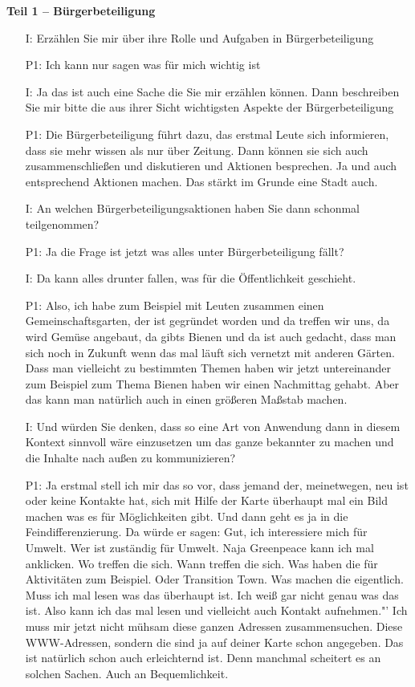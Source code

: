 \documentclass{sigchi}
\begin{document}
\textbf{Teil 1 -- B{\"u}rgerbeteiligung}
\begin{itemize}
    \item[I:] Erz{\"a}hlen Sie mir {\"u}ber ihre Rolle und Aufgaben in B{\"u}rgerbeteiligung
    \item[P1:] Ich kann nur sagen was f{\"u}r mich wichtig ist
    \item[I:] Ja das ist auch eine Sache die Sie mir erz{\"a}hlen k{\"o}nnen. Dann beschreiben Sie mir bitte die aus ihrer Sicht wichtigsten Aspekte der B{\"u}rgerbeteiligung
    \item[P1:] Die B{\"u}rgerbeteiligung f{\"u}hrt dazu, das erstmal Leute sich informieren, dass sie mehr wissen als nur {\"u}ber Zeitung. Dann k{\"o}nnen sie sich auch zusammenschlie{\ss}en und diskutieren und Aktionen besprechen. Ja und auch entsprechend Aktionen machen. Das st{\"a}rkt im Grunde eine Stadt auch.
    \item[I:] An welchen B{\"u}rgerbeteiligungsaktionen haben Sie dann schonmal teilgenommen?
	\item[P1:] Ja die Frage ist jetzt was alles unter B{\"u}rgerbeteiligung f{\"a}llt?
	\item[I:] Da kann alles drunter fallen, was f{\"u}r die Öffentlichkeit geschieht.
	\item[P1:] Also, ich habe zum Beispiel mit Leuten zusammen einen Gemeinschaftsgarten, der ist gegr{\"u}ndet worden und da treffen wir uns, da wird Gem{\"u}se angebaut, da gibts Bienen und da ist auch gedacht, dass man sich noch in Zukunft wenn das mal l{\"a}uft sich vernetzt mit anderen G{\"a}rten. Dass man vielleicht zu bestimmten Themen haben wir jetzt untereinander zum Beispiel zum Thema Bienen haben wir einen Nachmittag gehabt. Aber das kann man nat{\"u}rlich auch in einen gr{\"o}{\ss}eren Ma{\ss}stab machen.
	\item[I:] Und w{\"u}rden Sie denken, dass so eine Art von Anwendung dann in diesem Kontext sinnvoll w{\"a}re einzusetzen um das ganze bekannter zu machen und die Inhalte nach au{\ss}en zu kommunizieren?
	\item[P1:] Ja erstmal stell ich mir das so vor, dass jemand der, meinetwegen, neu ist oder keine Kontakte hat, sich mit Hilfe der Karte {\"u}berhaupt mal ein Bild machen was es f{\"u}r M{\"o}glichkeiten gibt. Und dann geht es ja in die Feindifferenzierung. Da w{\"u}rde er sagen: Gut, ich interessiere mich f{\"u}r Umwelt. Wer ist zust{\"a}ndig f{\"u}r Umwelt. Naja Greenpeace kann ich mal anklicken. Wo treffen die sich. Wann treffen die sich. Was haben die f{\"u}r Aktivit{\"a}ten zum Beispiel. Oder Transition Town. Was machen die eigentlich. Muss ich mal lesen was das {\"u}berhaupt ist. Ich wei{\ss} gar nicht genau was das ist. Also kann ich das mal lesen und vielleicht auch Kontakt aufnehmen."' Ich muss mir jetzt nicht m{\"u}hsam diese ganzen Adressen zusammensuchen. Diese WWW-Adressen, sondern die sind ja auf deiner Karte schon angegeben. Das ist nat{\"u}rlich schon auch erleichternd ist. Denn manchmal scheitert es an solchen Sachen. Auch an Bequemlichkeit.

\end{itemize}
\end{document}
